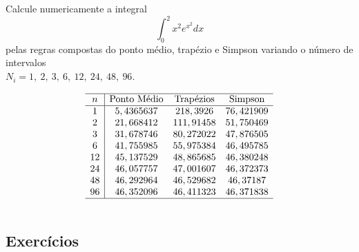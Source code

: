 \begin{ex}Calcule numericamente a integral
$$
\int_0^2 x^2 e^{x^2}dx
$$
pelas regras compostas do ponto médio, trapézio e Simpson variando o número de intervalos \\$N_i=1,\ 2,\ 3,\ 6,\ 12,\ 24,\ 48,\ 96$.
\end{ex}
\begin{sol}
  \begin{equation*}
  \begin{array}{c|ccc}\hline
    n &  \text{Ponto Médio} &  \text{Trapézios} & \text{Simpson}\\ \hline
    1 & 5,4365637&218,3926&76,421909\\
    2&21,668412&111,91458&51,750469\\
    3&31,678746&80,272022&47,876505\\
    6&41,755985&55,975384&46,495785\\
    12&45,137529&48,865685&46,380248\\
    24&46,057757&47,001607&46,372373\\
    48&46,292964&46,529682&46,37187\\
    96&46,352096&46,411323&46,371838\\\hline
    \multicolumn{4}{c}{}
  \end{array}    
  \end{equation*}
\end{sol}

\subsection*{Exercícios}



